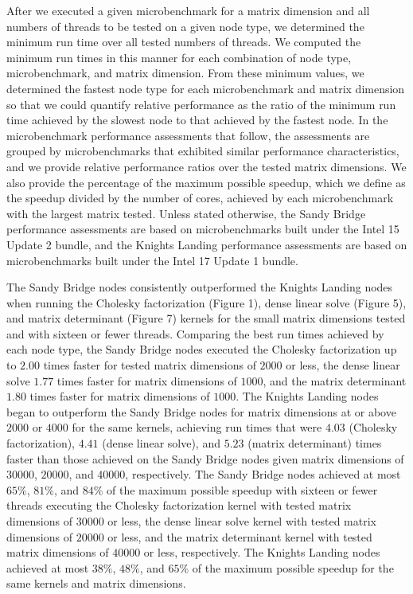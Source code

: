 After we executed a given microbenchmark for a matrix dimension and all numbers
  of threads to be tested on a given node type, we determined the minimum run
  time over all tested numbers of threads.
We computed the minimum run times in this manner for each combination of node
  type, microbenchmark, and matrix dimension.
From these minimum values, we determined the fastest node type for each
  microbenchmark and matrix dimension so that we could quantify relative
  performance as the ratio of the minimum run time achieved by the slowest node
  to that achieved by the fastest node.
In the microbenchmark performance assessments that follow, the assessments are
  grouped by microbenchmarks that exhibited similar performance characteristics,
  and we provide relative performance ratios over the tested matrix dimensions.
We also provide the percentage of the maximum possible speedup, which we define
  as the speedup divided by the number of cores, achieved by each microbenchmark
  with the largest matrix tested.
Unless stated otherwise, the Sandy Bridge performance assessments are based on
  microbenchmarks built under the Intel 15 Update 2 bundle, and the Knights
  Landing performance assessments are based on microbenchmarks built under the
  Intel 17 Update 1 bundle. 

The Sandy Bridge nodes consistently outperformed the Knights Landing nodes when
  running the Cholesky factorization (Figure 1), dense linear solve (Figure 5),
  and matrix determinant (Figure 7) kernels for the small matrix dimensions
  tested and with sixteen or fewer threads.
Comparing the best run times achieved by each node type, the Sandy Bridge nodes
  executed the Cholesky factorization up to $2.00$ times faster for tested
  matrix dimensions of $2000$ or less, the dense linear solve $1.77$ times
  faster for matrix dimensions of $1000$, and the matrix determinant $1.80$
  times faster for matrix dimensions of $1000$.
The Knights Landing nodes began to outperform the Sandy Bridge nodes for matrix
  dimensions at or above $2000$ or $4000$ for the same kernels, achieving run
  times that were $4.03$ (Cholesky factorization), $4.41$ (dense linear solve),
  and $5.23$ (matrix determinant) times faster than those achieved on the Sandy
  Bridge nodes given matrix dimensions of $30000$, $20000$, and $40000$,
  respectively.
The Sandy Bridge nodes achieved at most $65\%$, $81\%$, and $84\%$ of the
  maximum possible speedup with sixteen or fewer threads executing the Cholesky
  factorization kernel with tested matrix dimensions of $30000$ or less, the
  dense linear solve kernel with tested matrix dimensions of $20000$ or less,
  and the matrix determinant kernel with tested matrix dimensions of $40000$ or
  less, respectively.
The Knights Landing nodes achieved at most $38\%$, $48\%$, and $65\%$ of the
  maximum possible speedup for the same kernels and matrix dimensions.

